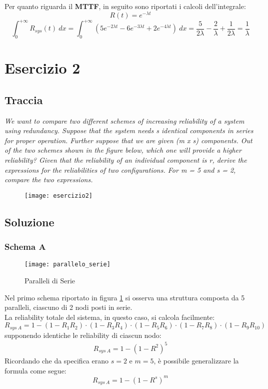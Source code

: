 Per quanto riguarda il \textbf{MTTF}, in seguito sono riportati
i calcoli dell'integrale:
$$R(t) = e^{-\lambda t}$$
$$\int_0^{+\infty} R_{sys}(t)\ dx =
\int_0^{+\infty} (5e^{-2\lambda t}-6e^{-3\lambda t}+2e^{-4\lambda t}) \ dx =
\frac{5}{2\lambda} - \frac{2}{\lambda} + \frac{1}{2\lambda} =
\frac{1}{\lambda}$$

\clearpage

\section{Esercizio 2}
\subsection{Traccia}
\textit{We want to compare two different schemes of increasing reliability of a
system using redundancy. Suppose that the system needs s identical components
in series for proper operation. Further suppose that we are given (m x s)
components. Out of the two schemes shown in the figure below, which one will
provide a higher reliability? Given that the reliability of an individual
component is r, derive the expressions for the reliabilities of two configurations.
For m = 5 and s = 2, compare the two expressions.}

\begin{figure}[!htbp]
  \centering
  \texttt{[image: esercizio2]}
\end{figure}

\clearpage
\subsection{Soluzione}

\subsubsection{Schema A}

\begin{figure}[!htbp]
  \centering
  \texttt{[image: parallelo\_serie]}
  \caption{Paralleli di Serie}
  \label{dep_parallelo_serie}
\end{figure}

Nel primo schema riportato in figura \ref{dep_parallelo_serie} si osserva una
struttura composta da 5 paralleli, ciascuno di 2 nodi posti in serie.\\
La reliability totale del sistema, in questo caso, si calcola facilmente:
$$R_{sys\ A} = 1-(1-R_1R_2)\cdot(1-R_3R_4)\cdot(1-R_5R_6)\cdot(1-R_7R_8)\cdot(1-R_9R_{10})$$
supponendo identiche le reliability di ciascun nodo:
\begin{align}
  R_{sys\ A} = 1-(1-R^2)^5
 \label{eq1}
\end{align}
Ricordando che da specifica erano $s=2$ e $m=5$, è possibile generalizzare la
formula come segue:
$$R_{sys\ A} = 1-(1-R^s)^m$$

